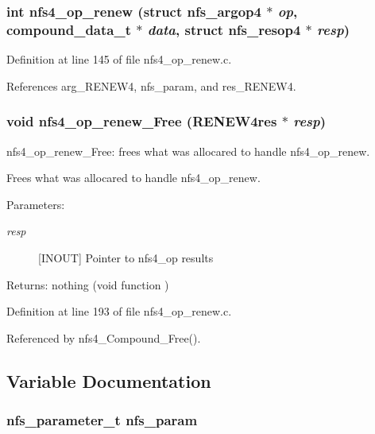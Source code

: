 \subsubsection{\setlength{\rightskip}{0pt plus 5cm}int nfs4\_\-op\_\-renew (struct nfs\_\-argop4 $\ast$ {\em op}, compound\_\-data\_\-t $\ast$ {\em data}, struct nfs\_\-resop4 $\ast$ {\em resp})}\label{nfs4__op__renew_8c_a3}




Definition at line 145 of file nfs4\_\-op\_\-renew.c.

References arg\_\-RENEW4, nfs\_\-param, and res\_\-RENEW4.
\subsubsection{\setlength{\rightskip}{0pt plus 5cm}void nfs4\_\-op\_\-renew\_\-Free (RENEW4res $\ast$ {\em resp})}\label{nfs4__op__renew_8c_a4}


nfs4\_\-op\_\-renew\_\-Free: frees what was allocared to handle nfs4\_\-op\_\-renew.

Frees what was allocared to handle nfs4\_\-op\_\-renew.

\begin{Desc}
\item[Parameters:]
\begin{description}
\item[{\em resp}][INOUT] Pointer to nfs4\_\-op results\end{description}
\end{Desc}
\begin{Desc}
\item[Returns:]nothing (void function ) \end{Desc}


Definition at line 193 of file nfs4\_\-op\_\-renew.c.

Referenced by nfs4\_\-Compound\_\-Free().

\subsection{Variable Documentation}
\subsubsection{\setlength{\rightskip}{0pt plus 5cm}nfs\_\-parameter\_\-t {\bf nfs\_\-param}}\label{nfs4__op__renew_8c_a2}


